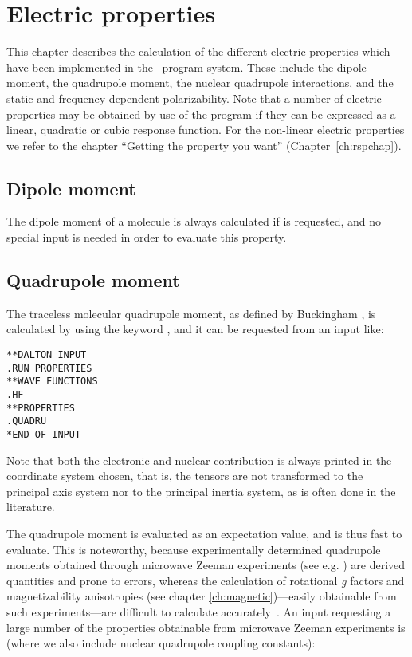 \chapter{Electric properties}\label{ch:electric}

This chapter describes the calculation of the different electric
properties which have been implemented in the \siraba\ program system.
These include the dipole moment, the quadrupole
moment, the nuclear quadrupole
interactions, and the static and frequency dependent
polarizability. Note that a number of electric
properties may be
obtained by use of the {\resp} program if they can be expressed as a
linear, quadratic or cubic response function. For the non-linear
electric properties we refer to the chapter ``Getting the property you
want'' (Chapter~\ref{ch:rspchap}).

\section{Dipole moment}\label{sec:dipmom}

The dipole moment of a  molecule is always
calculated if  is
requested, and no special input is needed in order to evaluate this property.

\section{Quadrupole moment}\label{sec:quadmom}

The traceless molecular quadrupole moment, as
defined by Buckingham
\cite{adbacp12}, is calculated by using the keyword , and
it can be requested from an input like:

\begin{verbatim}
**DALTON INPUT
.RUN PROPERTIES
**WAVE FUNCTIONS
.HF
**PROPERTIES
.QUADRU
*END OF INPUT
\end{verbatim}

Note that both the electronic and nuclear contribution is always
printed in the coordinate system chosen, that is, the tensors are not
transformed to the principal axis system nor to the principal inertia
system, as is often done in the literature.

The quadrupole moment is evaluated as an expectation value, and is
thus fast to evaluate. This is noteworthy, because experimentally
determined quadrupole moments obtained through microwave Zeeman experiments
(see e.g.  \cite{whmklwhfjcp48,jsdhszna46}) are derived
quantities and prone to errors,
whereas the calculation of rotational {\em g} factors and magnetizability
anisotropies (see chapter
\ref{ch:magnetic})---easily obtainable from such
experiments---are difficult to calculate accurately~\cite{krthcpl264}. An input
requesting a large number of the properties obtainable from microwave
Zeeman experiments is (where we also include nuclear quadrupole
coupling constants):

